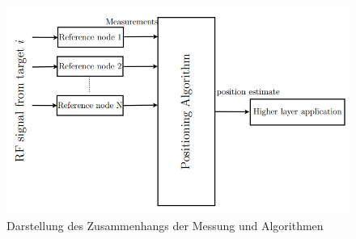 \begin{figure}[h!]
  \centering
  \includegraphics[scale=0.45]{img/algo_1}

  \caption{Darstellung des Zusammenhangs der Messung und Algorithmen}
  \label{fig:algo}
\end{figure}

